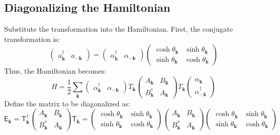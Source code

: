 \documentclass[aps, prx, nofootinbib, superscriptaddress]{revtex4-2}
\begin{document}
\subsection*{Diagonalizing the Hamiltonian}

Substitute the transformation into the Hamiltonian. First, the conjugate transformation is:
\begin{equation}
    \begin{pmatrix}
        a^{\dagger}_{\mathbf{k}} & a_{-\mathbf{k}}
    \end{pmatrix}
    =
    \begin{pmatrix}
        \alpha^{\dagger}_{\mathbf{k}} & \alpha_{-\mathbf{k}}
    \end{pmatrix}
    \begin{pmatrix}
        \cosh \theta_{\mathbf{k}} & \sinh \theta_{\mathbf{k}} \\
        \sinh \theta_{\mathbf{k}} & \cosh \theta_{\mathbf{k}}
    \end{pmatrix}
\end{equation}
Thus, the Hamiltonian becomes:
\begin{equation}
    H = \frac{1}{2} \sum_{\mathbf{k}}
    \begin{pmatrix}
        \alpha^{\dagger}_{\mathbf{k}} & \alpha_{-\mathbf{k}}
    \end{pmatrix}
    T_{\mathbf{k}}
    \begin{pmatrix}
        A_{\mathbf{k}} & B_{\mathbf{k}} \\
        B_{\mathbf{k}}^{*} & A_{\mathbf{k}}
    \end{pmatrix}
    T_{\mathbf{k}}
    \begin{pmatrix}
        \alpha_{\mathbf{k}} \\
        \alpha^{\dagger}_{-\mathbf{k}}
    \end{pmatrix}
\end{equation}
Define the matrix to be diagonalized as:
\begin{equation}
    \mathsf{E}_{\mathbf{k}} = \mathsf{T}_{\mathbf{k}}^{\dagger}
    \begin{pmatrix}
        A_{\mathbf{k}} & B_{\mathbf{k}} \\
        B_{\mathbf{k}}^{*} & A_{\mathbf{k}}
    \end{pmatrix}
    \mathsf{T}_{\mathbf{k}}
    =
    \begin{pmatrix}
        \cosh \theta_{\mathbf{k}} & \sinh \theta_{\mathbf{k}} \\
        \sinh \theta_{\mathbf{k}} & \cosh \theta_{\mathbf{k}}
    \end{pmatrix}
    \begin{pmatrix}
        A_{\mathbf{k}} & B_{\mathbf{k}} \\
        B_{\mathbf{k}}^{*} & A_{\mathbf{k}}
    \end{pmatrix}
    \begin{pmatrix}
        \cosh \theta_{\mathbf{k}} & \sinh \theta_{\mathbf{k}} \\
        \sinh \theta_{\mathbf{k}} & \cosh \theta_{\mathbf{k}}
    \end{pmatrix}
\end{equation}
\end{document}
